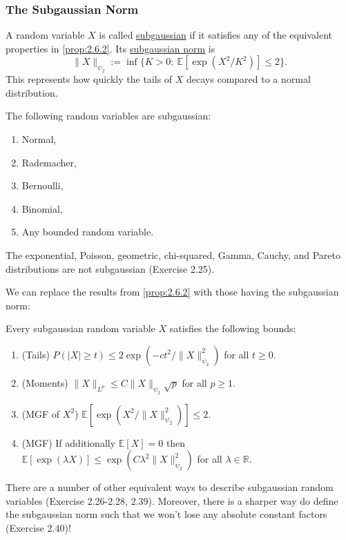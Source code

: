 \subsubsection{The Subgaussian Norm}
\begin{definition}[]
\label{def:2.6.5}
A random variable $X$ is called \underline{subgaussian} if it satisfies any of the equivalent properties 
in \cref{prop:2.6.2}. Its \underline{subgaussian norm} is 
\[ \|X\|_{\psi_2} := \inf\{ K > 0: \ \mathbb{E}[\exp{(X^2 / K^2)}] \leq 2 \}. \]
This represents how quickly the tails of $X$ decays compared to a normal distribution.
\end{definition}

\begin{example}[]
\label{ex:2.6.6}
The following random variables are subgaussian: 
\begin{enumerate}
	\item Normal,
	\item Rademacher,
	\item Bernoulli, 
	\item Binomial,
	\item Any bounded random variable.
\end{enumerate}
The exponential, Poisson, geometric, chi-squared, Gamma, Cauchy, and Pareto distributions are not 
subgaussian (Exercise 2.25).
\end{example}

We can replace the results from \ref{prop:2.6.2} with those having the subgaussian norm:
\begin{proposition}
\label{prop:2.6.7}
Every subgaussian random variable $X$ satisfies the following bounds:
\begin{enumerate}
	\item (Tails) $P(|X| \geq t) \leq 2\exp{(-ct^2 / \lVert X \rVert_{\psi_2}^2)}$ for all $t \geq 0$.
	\item (Moments) $\lVert X \rVert_{L^p} \leq C\lVert X \rVert_{\psi_2} \sqrt{p}$ for all $p \geq 1$.
	\item (MGF of $X^2$) $\mathbb{E}[\exp{(X^2 / \lVert X \rVert_{\psi_2}^2)}] \leq 2$.
	\item (MGF) If additionally $\mathbb{E}[X] = 0$ then 
	$\mathbb{E}[\exp{(\lambda X)}] \leq \exp{(C \lambda^2 
	\lVert X \rVert_{\psi_2}^2)}$ for all $\lambda \in \mathbb{R}$.
\end{enumerate}
\end{proposition}

There are a number of other equivalent ways to describe subgaussian random variables (Exercise 2.26-2.28, 
2.39). Moreover, there is a sharper way do define the subgaussian norm such that we won't lose any absolute 
constant factors (Exercise 2.40)!


